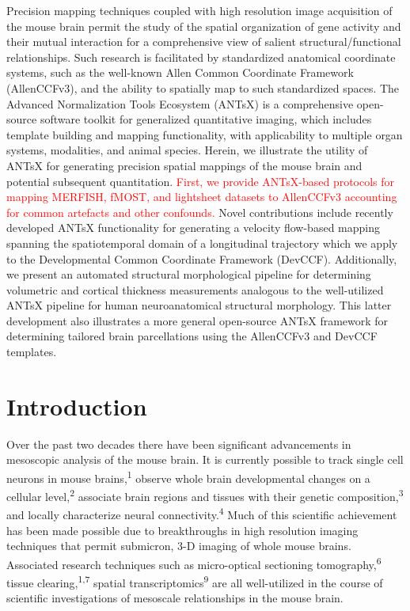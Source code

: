 \documentclass[
  12pt,
]{article}
\begin{document}
Precision mapping techniques coupled with high resolution image
acquisition of the mouse brain permit the study of the spatial
organization of gene activity and their mutual interaction for a
comprehensive view of salient structural/functional relationships. Such
research is facilitated by standardized anatomical coordinate systems,
such as the well-known Allen Common Coordinate Framework (AllenCCFv3),
and the ability to spatially map to such standardized spaces. The
Advanced Normalization Tools Ecosystem (ANTsX) is a comprehensive
open-source software toolkit for generalized quantitative imaging, which
includes template building and mapping functionality, with applicability
to multiple organ systems, modalities, and animal species. Herein, we
illustrate the utility of ANTsX for generating precision spatial
mappings of the mouse brain and potential subsequent quantitation.
\textcolor{red}{First, we provide
ANTsX-based protocols for mapping MERFISH, fMOST, and lightsheet datasets to
AllenCCFv3 accounting for common artefacts and other confounds.} Novel
contributions include recently developed ANTsX functionality for
generating a velocity flow-based mapping spanning the spatiotemporal
domain of a longitudinal trajectory which we apply to the Developmental
Common Coordinate Framework (DevCCF). Additionally, we present an
automated structural morphological pipeline for determining volumetric
and cortical thickness measurements analogous to the well-utilized ANTsX
pipeline for human neuroanatomical structural morphology. This latter
development also illustrates a more general open-source ANTsX framework
for determining tailored brain parcellations using the AllenCCFv3 and
DevCCF templates.

\clearpage

\hypertarget{introduction}{%
\section{Introduction}\label{introduction}}

Over the past two decades there have been significant advancements in
mesoscopic analysis of the mouse brain. It is currently possible to
track single cell neurons in mouse brains,\textsuperscript{1} observe
whole brain developmental changes on a cellular
level,\textsuperscript{2} associate brain regions and tissues with their
genetic composition,\textsuperscript{3} and locally characterize neural
connectivity.\textsuperscript{4} Much of this scientific achievement has
been made possible due to breakthroughs in high resolution imaging
techniques that permit submicron, 3-D imaging of whole mouse brains.
Associated research techniques such as micro-optical sectioning
tomography,\textsuperscript{6} tissue clearing,\textsuperscript{1,7}
spatial transcriptomics\textsuperscript{9} are all well-utilized in the
course of scientific investigations of mesoscale relationships in the
mouse brain.
\end{document}
